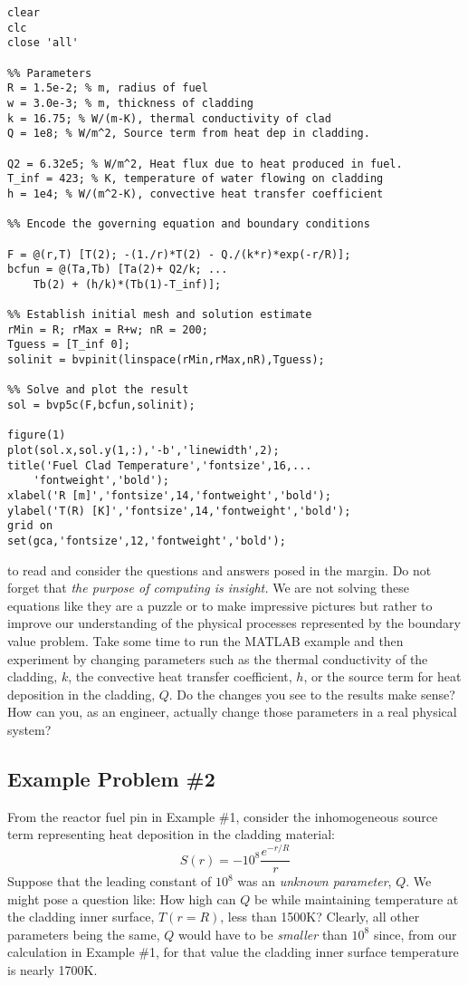 \begin{lstlisting}[style=myMatlab,name=lec30n-ex1]
clear
clc
close 'all'

%% Parameters
R = 1.5e-2; % m, radius of fuel
w = 3.0e-3; % m, thickness of cladding
k = 16.75; % W/(m-K), thermal conductivity of clad
Q = 1e8; % W/m^2, Source term from heat dep in cladding.

Q2 = 6.32e5; % W/m^2, Heat flux due to heat produced in fuel.
T_inf = 423; % K, temperature of water flowing on cladding
h = 1e4; % W/(m^2-K), convective heat transfer coefficient

%% Encode the governing equation and boundary conditions

F = @(r,T) [T(2); -(1./r)*T(2) - Q./(k*r)*exp(-r/R)];
bcfun = @(Ta,Tb) [Ta(2)+ Q2/k; ...
    Tb(2) + (h/k)*(Tb(1)-T_inf)];

%% Establish initial mesh and solution estimate
rMin = R; rMax = R+w; nR = 200;
Tguess = [T_inf 0];
solinit = bvpinit(linspace(rMin,rMax,nR),Tguess);

%% Solve and plot the result
sol = bvp5c(F,bcfun,solinit);

figure(1)
plot(sol.x,sol.y(1,:),'-b','linewidth',2);
title('Fuel Clad Temperature','fontsize',16,...
    'fontweight','bold');
xlabel('R [m]','fontsize',14,'fontweight','bold');
ylabel('T(R) [K]','fontsize',14,'fontweight','bold');
grid on
set(gca,'fontsize',12,'fontweight','bold');
\end{lstlisting}

 to read and consider the questions and answers posed in the margin.  Do not forget that \emph{the purpose of computing is insight.}  We are not solving these equations like they are a puzzle or to make impressive pictures but rather to improve our understanding of the physical processes represented by the boundary value problem.  Take some time to run the MATLAB example and then experiment by changing parameters such as the thermal conductivity of the cladding, $k$, the convective heat transfer coefficient, $h$, or the source term for heat deposition in the cladding, $Q$. Do the changes you see to the results make sense?  How can you, as an engineer, actually change those parameters in a real physical system?

\subsection{Example Problem \#2}

From the reactor fuel pin in Example \#1, consider the inhomogeneous source term representing heat deposition in the cladding material:
\begin{equation*}
S(r) = -10^8\frac{e^{-r/R}}{r}
\end{equation*}
Suppose that the leading constant of $10^8$ was an \emph{unknown parameter}, $Q$.  We might pose a question like: How high can $Q$ be while maintaining temperature at the cladding inner surface, $T(r=R)$, less than 1500K?  Clearly, all other parameters being the same, $Q$ would have to be \emph{smaller} than $10^8$ since, from our calculation in Example \#1, for that value the cladding inner surface temperature is nearly 1700K.  

